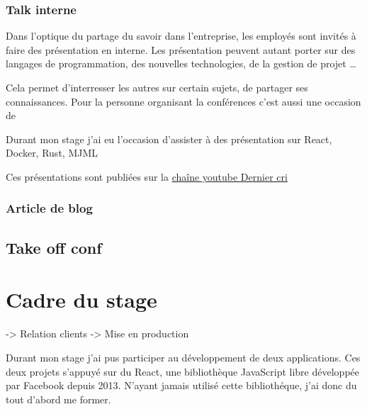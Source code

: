 \subsubsection{Talk interne}\label{talk-interne}

\bigskip

Dans l'optique du partage du savoir dans l'entreprise, les employés sont
invités à faire des présentation en interne. Les présentation peuvent
autant porter sur des langages de programmation, des nouvelles
technologies, de la gestion de projet \ldots{}

\bigskip

Cela permet d'interresser les autres sur certain sujets, de partager ses
connaissances. Pour la personne organisant la conférences c'est aussi
une occasion de

\bigskip

Durant mon stage j'ai eu l'occasion d'assister à des présentation sur
React, Docker, Rust, MJML

\bigskip

Ces présentations sont publiées sur la
\href{https://www.youtube.com/channel/UCDfdBlzldhg_PEu3xZTPsHg}{chaîne
youtube Dernier cri}

\bigskip

\subsubsection{Article de blog}\label{article-de-blog}

\bigskip

\bigskip

\subsection{Take off conf}\label{take-off-conf}

\bigskip

\bigskip

\newpage

\section{Cadre du stage}\label{cadre-du-stage}

\bigskip

-\textgreater{} Relation clients -\textgreater{} Mise en production

Durant mon stage j'ai pus participer au développement de deux
applications. Ces deux projets s'appuyé sur du React, une bibliothèque
JavaScript libre développée par Facebook depuis 2013. N'ayant jamais
utilisé cette bibliothéque, j'ai donc du tout d'abord me former.

